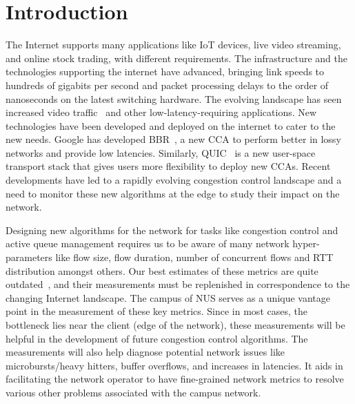 
\chapter{Introduction} %

\label{Chapter1} %


The Internet supports many applications like IoT devices, live video streaming, and online stock trading, with different requirements. The infrastructure and the technologies supporting the internet have advanced, bringing link speeds to hundreds of gigabits per second and packet processing delays to the order of nanoseconds on the latest switching hardware. The evolving landscape has seen increased video traffic~\cite{gipr-sandvine22} and other low-latency-requiring applications. New technologies have been developed and deployed on the internet to cater to the new needs. Google has developed BBR~\cite{bbrgoogle-acmqueue16}, a new CCA to perform better in lossy networks and provide low latencies. Similarly, QUIC~\cite{quic-sigcomm17} is a new user-space transport stack that gives users more flexibility to deploy new CCAs. Recent developments have led to a rapidly evolving congestion control landscape and a need to monitor these new algorithms at the edge to study their impact on the network.

Designing new algorithms for the network for tasks like congestion control and active queue management requires us to be aware of many network hyper-parameters like flow size, flow duration, number of concurrent flows and RTT distribution amongst others. Our best estimates of these metrics are quite outdated~\cite{tcprtt-imc03,revisittcp-imc21,2004-shakkottai-t20}, and their measurements must be replenished in correspondence to the changing Internet landscape. The campus of NUS serves as a unique vantage point in the measurement of these key metrics. Since in most cases, the bottleneck lies near the client (edge of the network), these measurements will be helpful in the development of future congestion control algorithms.
The measurements will also help diagnose potential network issues like microbursts/heavy hitters, buffer overflows, and increases in latencies. It aids in facilitating the network operator to have fine-grained network metrics to resolve various other problems associated with the campus network. 

